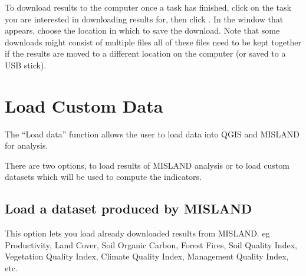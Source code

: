 \documentclass[letterpaper,10pt,english]{sphinxmanual}
\begin{document}

\sphinxAtStartPar
To download results to the computer once a task has finished, click on the task
you are interested in downloading results for, then click .
In the window that appears, choose the location in which to save the download.
Note that some downloads might consist of multiple files \sphinxhyphen{} all of these files
need to be kept together if the results are moved to a different location on
the computer (or saved to a USB stick).


\sphinxstepscope


\chapter{Load Custom Data}
\label{\detokenize{Qgis_Plugin/load_data:load-custom-data}}\label{\detokenize{Qgis_Plugin/load_data::doc}}



\sphinxAtStartPar
The “Load data” function allows the user to load data into QGIS and
MISLAND for analysis.

\sphinxAtStartPar
There are two options, to load results of MISLAND analysis or to load
custom datasets which will be used to compute the indicators.



\section{Load a dataset produced by MISLAND}
\label{\detokenize{Qgis_Plugin/load_data:load-a-dataset-produced-by-misland}}
\sphinxAtStartPar
This option lets you load already downloaded results from MISLAND. eg Productivity, Land Cover, Soil Organic Carbon,
Forest Fires, Soil Quality Index, Vegetation Quality Index, Climate Quality Index, Management Quality Index, etc.
\end{document}
